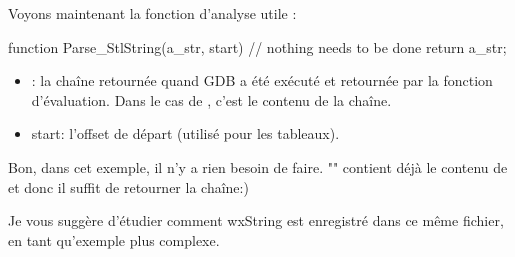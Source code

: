 Voyons maintenant la fonction d'analyse utile :

\begin{code}
function Parse_StlString(a_str, start)
{
    // nothing needs to be done
    return a_str;
}
\end{code}

\begin{itemize}
\item {}: la chaîne retournée quand GDB a été exécuté et retournée par la fonction d'évaluation. Dans le cas de , c'est le contenu de la chaîne.
\item start: l'offset de départ (utilisé pour les tableaux).
\end{itemize}

Bon, dans cet exemple, il n'y a rien besoin de faire. "" contient déjà le contenu de  et donc il suffit de retourner la chaîne:)

Je vous suggère d'étudier comment wxString est enregistré dans ce même fichier, en tant qu'exemple plus complexe. 
